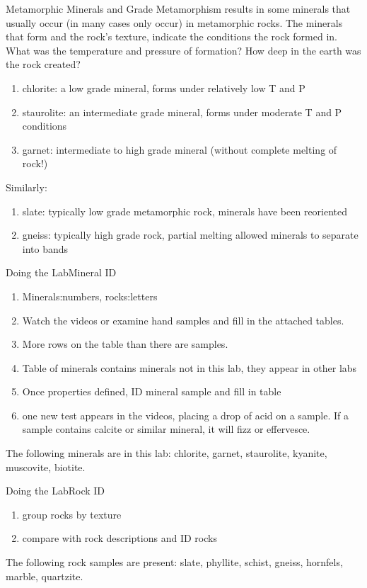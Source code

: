 \documentclass[ignorenonframetext,slidestop]{beamer}
\begin{document}
\begin{frame}{Metamorphic Minerals and Grade}
    Metamorphism results in some minerals that usually occur (in many cases only occur) in metamorphic rocks. The minerals that form and the rock's texture, indicate the conditions the rock formed in. What was the temperature and pressure of formation? How deep in the earth was the rock created?
    
    \begin{enumerate}
    \item chlorite: a low grade mineral, forms under relatively low T and P
    \item staurolite: an intermediate grade mineral, forms under moderate T and P conditions
    \item garnet: intermediate to high grade mineral (without complete melting of rock!)
    \end{enumerate}

    Similarly:
    \begin{enumerate}
    \item slate: typically low grade metamorphic rock, minerals have been reoriented
    \item gneiss: typically high grade rock, partial melting allowed minerals to separate into bands 
    \end{enumerate}
\end{frame}


\begin{frame}{Doing the Lab}{Mineral ID}
  \begin{enumerate}
  \item Minerals:numbers, rocks:letters
  \item Watch the videos or examine hand samples and fill in the attached tables.
  \item More rows on the table than there are samples.
  \item Table of minerals contains minerals not in this lab, they appear in other labs
  \item Once properties defined, ID mineral sample and fill in table
  \item one new test appears in the videos, placing a drop of acid on a sample. If a sample contains calcite or similar mineral, it will fizz or effervesce.
  \end{enumerate}
The following minerals are in this lab: chlorite, garnet, staurolite, kyanite, muscovite, biotite. 
\end{frame}

\begin{frame}{Doing the Lab}{Rock ID}
  \begin{enumerate}
  \item group rocks by texture
  \item compare with rock descriptions and ID rocks
  \end{enumerate}
The following rock samples are present: slate, phyllite, schist, gneiss, hornfels, marble, quartzite. 
\end{frame}
\end{document}
